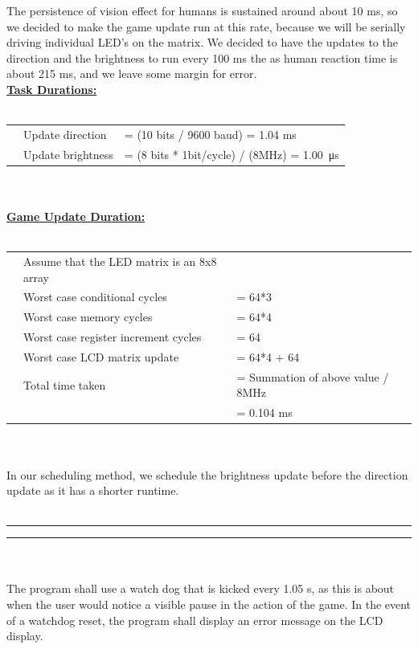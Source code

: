 \documentclass[11pt]{article}
\newcommand{\question}[2] {
    \noindent \begin{minipage}{\textwidth}
        \vspace{.25in} \hrule\vspace{0.5em}
        \noindent{\bf #1: #2} \vspace{0.5em}
        \hrule \vspace{.10in}
    \end{minipage} \\ \\
}
\begin{document}
    The persistence of vision effect for humans is sustained around about 10 ms, so we decided to make the game
    update run at this rate, because we will be serially driving individual LED's on the matrix. We decided to have the 
    updates to the direction and the brightness to run every 100 ms the as human reaction time is about 215 ms, and
    we leave some margin for error. \\

    \noindent \textbf{\underline{Task Durations:}} \\ \\
    \begin{tabular}{rll}
        \indent & Update direction &= (10 bits / 9600 baud) = 1.04 ms \\
        & Update brightness &= (8 bits * 1bit/cycle) / (8MHz) = \SI{1.00}{\micro\second} \\
    \end{tabular} \\ \\

    \noindent \textbf{\underline{Game Update Duration:}} \\ \\
    \begin{tabular}{rll}
        \indent & Assume that the LED matrix is an 8x8 array	& \\
        & Worst case conditional cycles &= 64*3 \\
        & Worst case memory cycles &= 64*4 \\
        & Worst case register increment cycles &= 64 \\
        & Worst case LCD matrix update &= 64*4 + 64 \\
        & Total time taken &= Summation of above value / 8MHz \\
        & &= 0.104 ms
    \end{tabular} \\ \\

    In our scheduling method, we schedule the brightness update before the direction update as it has a shorter runtime. \\ \\

\question{Part 6}{Watchdog/COP}
    \indent The program shall use a watch dog that is kicked every 1.05 s, as this is about when the user would notice a
    visible pause in the action of the game. In the event of a watchdog reset, the program shall display an error message
    on the LCD display. \\ \\
\end{document}
